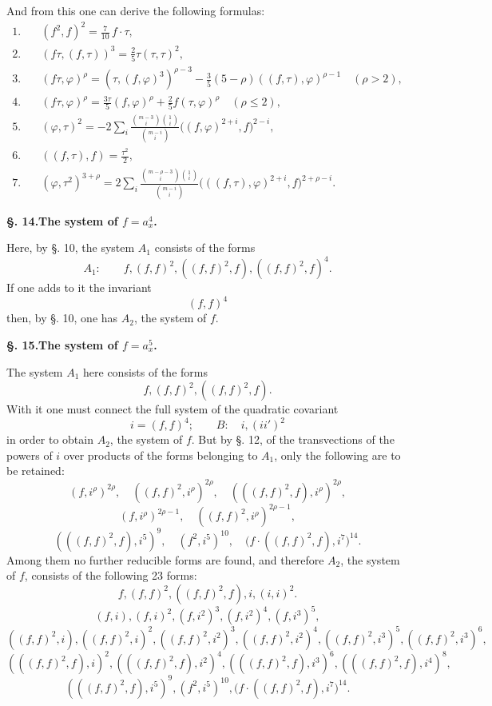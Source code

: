 \documentclass[10pt]{article}
\begin{document}
And from this one can derive the following formulas:
\begin{align*}
1.\quad &(f^2,f)^2=\frac7{10}\,f\cdot\tau,\\
2.\quad &(f\tau,(f,\tau))^3=\frac25\tau(\tau,\tau)^2,\\
3.\quad &(f\tau,\varphi)^\rho=(\tau,(f,\varphi)^3)^{\rho-3}-\frac35(5-\rho)((f,\tau),\varphi)^{\rho-1}\quad(\rho>2),\\
4.\quad &(f\tau,\varphi)^\rho=\frac{3\tau}{5}(f,\varphi)^\rho+\frac25 f(\tau,\varphi)^\rho\quad(\rho\leq 2),\\
5.\quad &(\varphi,\tau)^2=-2\sum_i\frac{\binom{m-3}{i}\binom{1}{i}}{\binom{m-i}{i}}\bigl((f,\varphi)^{2+i},f\bigr)^{2-i},\\
6.\quad &((f,\tau),f)=\frac{\tau^2}{2},\\
7.\quad &(\varphi,\tau^2)^{3+\rho}=2\sum_i\frac{\binom{m-\rho-3}{i}\binom{1}{i}}{\binom{m-i}{i}}\bigl(((f,\tau),\varphi)^{2+i},f\bigr)^{2+\rho-i}.
\end{align*}

\begin{center}
{\bfseries §. 14.\quad The system of $f=a_x^4$.}
\end{center}

Here, by §. 10, the system $A_1$ consists of the forms
\[
A_1:
\qquad f,(f,f)^2,((f,f)^2,f),((f,f)^2,f)^4.
\]
If one adds to it the invariant
\[
(f,f)^4
\]
then, by §. 10, one has $A_2$, the system of $f$.

\begin{center}
{\bfseries §. 15.\quad The system of $f=a_x^5$.}
\end{center}

The system $A_1$ here consists of the forms
\[
f,(f,f)^2,((f,f)^2,f).
\]
With it one must connect the full system of the quadratic covariant
\[
i=(f,f)^4;
\qquad
B:
\quad i,(ii')^2
\]
in order to obtain $A_2$, the system of $f$. But by §. 12, of the transvections of the powers of $i$ over products of the forms belonging to $A_1$, only the following are to be retained:
\[
(f,i^\rho)^{2\rho},\quad ((f,f)^2,i^\rho)^{2\rho},\quad (((f,f)^2,f),i^\rho)^{2\rho},
\]
\[
(f,i^\rho)^{2\rho-1},\quad ((f,f)^2,i^\rho)^{2\rho-1},
\]
\[
(((f,f)^2,f),i^5)^9,
\quad (f^2,i^5)^{10},
\quad \bigl(f\cdot((f,f)^2,f),i^7\bigr)^{14}.
\]
Among them no further reducible forms are found, and therefore $A_2$, the system of $f$, consists of the following 23 forms:
\[
f,(f,f)^2,((f,f)^2,f),i,(i,i)^2.
\]
\[
(f,i),(f,i)^2,(f,i^2)^3,(f,i^2)^4,(f,i^3)^5,
\]
\[
((f,f)^2,i),((f,f)^2,i)^2,((f,f)^2,i^2)^3,((f,f)^2,i^2)^4,((f,f)^2,i^3)^5,((f,f)^2,i^3)^6,
\]
\[
(((f,f)^2,f),i)^2,(((f,f)^2,f),i^2)^4,(((f,f)^2,f),i^3)^6,(((f,f)^2,f),i^4)^8,
\]
\[
(((f,f)^2,f),i^5)^9,(f^2,i^5)^{10},\bigl(f\cdot((f,f)^2,f),i^7\bigr)^{14}.
\]
\end{document}
